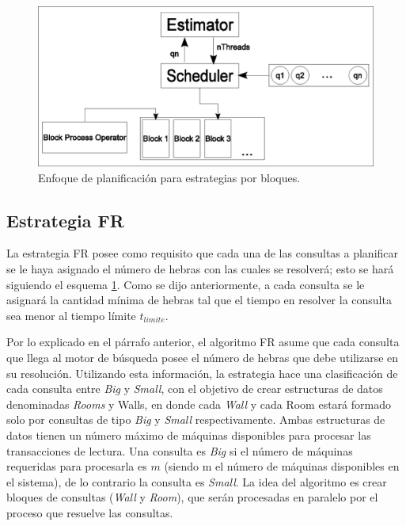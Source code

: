 \begin{figure}[!th]
\centering
\includegraphics[scale=.75]{images/scheduler_bloques.eps}
\caption{Enfoque de planificación para estrategias por bloques.}
\label{fig:schedulerbloques}
\end{figure}  


\subsection{Estrategia FR}
\label{scheduling:fr}
La estrategia FR posee como requisito que cada una de las consultas a planificar se le haya asignado el número de hebras con las cuales se resolverá; esto se hará siguiendo el esquema \ref{fig:schedulerbloques}. Como se dijo anteriormente, a cada consulta se le asignará la cantidad mínima de hebras tal que el tiempo en resolver la consulta sea menor al tiempo límite $t_{limite}$.

Por lo explicado en el párrafo anterior, el algoritmo FR asume que cada consulta que llega al motor de búsqueda posee el número de hebras que debe utilizarse en su resolución. Utilizando esta información, la estrategia hace una clasificación de cada consulta entre \textit{Big} y \textit{Small}, con el objetivo de crear estructuras de datos denominadas \textit{Rooms} y {Walls}, en donde cada \textit{Wall} y cada {Room} estará formado solo por consultas de tipo \textit{Big} y \textit{Small} respectivamente. Ambas estructuras de datos tienen un número máximo de máquinas disponibles para procesar las transacciones de lectura. Una consulta es \textit{Big} si el número de máquinas requeridas para procesarla es $m$ (siendo m el número de máquinas disponibles en el sistema), de lo contrario la consulta es \textit{Small}. La idea del algoritmo es crear bloques de consultas (\textit{Wall} y \textit{Room}), que serán procesadas en paralelo por el proceso que resuelve las consultas. 

